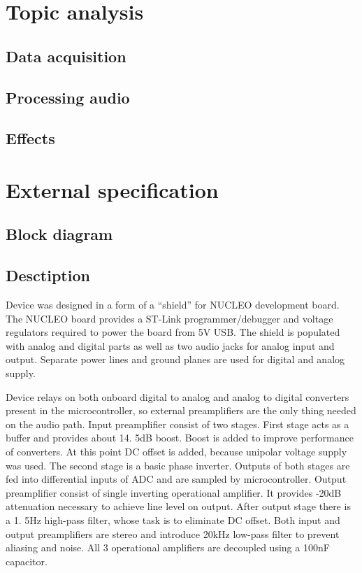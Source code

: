 \documentclass[a4paper,twoside,12pt]{book}
\begin{document}
\newpage



\chapter{Topic analysis}

\section{Data acquisition}

\section{Processing audio}

\section{Effects}

\newpage



\chapter{External specification}

\section{Block diagram}

\section{Desctiption}
Device was designed in a form of a “shield” for NUCLEO development board.
The NUCLEO board provides a ST-Link programmer/debugger and voltage regulators required to power the board from 5V USB.
The shield is populated with analog and digital parts as well as two audio jacks for analog input and output.
Separate power lines and ground planes are used for digital and analog supply.

Device relays on both onboard digital to analog and analog to digital converters present in the microcontroller, so external preamplifiers are the only thing needed on the audio path.
Input preamplifier consist of two stages.
First stage acts as a buffer and provides about 14.
5dB boost.
Boost is added to improve performance of converters.
At this point DC offset is added, because unipolar voltage supply was used.
The second stage is a basic phase inverter.
Outputs of both stages are fed into differential inputs of ADC and are sampled by microcontroller.
Output preamplifier consist of single inverting operational amplifier.
It provides -20dB attenuation necessary to achieve line level on output.
After output stage there is a 1.
5Hz high-pass filter, whose task is to eliminate DC offset.
Both input and output preamplifiers are stereo and introduce 20kHz low-pass filter to prevent aliasing and noise.
All 3 operational amplifiers are decoupled using a 100nF capacitor.
\end{document}
